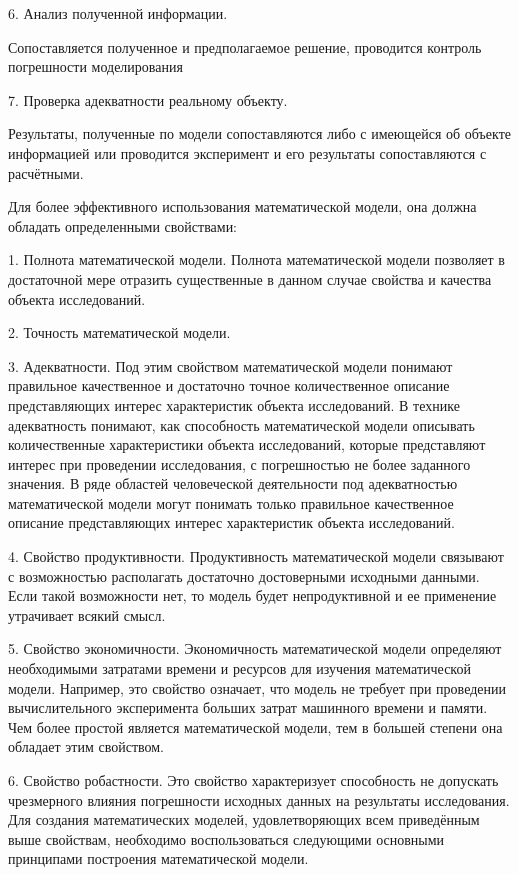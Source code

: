 6. Анализ полученной информации. 


Сопоставляется полученное и предполагаемое решение, проводится контроль погрешности моделирования


7. Проверка адекватности реальному объекту.


Результаты, полученные по модели сопоставляются либо с имеющейся об объекте информацией или проводится эксперимент и его результаты сопоставляются с расчётными.




Для более эффективного использования математической модели, она должна обладать определенными свойствами:


1. Полнота математической модели. Полнота математической модели позволяет в достаточной мере отразить существенные в данном случае свойства и качества объекта исследований. 


2. Точность математической модели.  


3. Адекватности. Под этим свойством математической модели понимают правильное качественное и достаточно точное количественное описание представляющих интерес характеристик объекта исследований. В технике адекватность понимают, как способность математической модели описывать количественные характеристики объекта исследований, которые представляют интерес при проведении исследования, с погрешностью не более заданного значения.
В ряде областей человеческой деятельности под адекватностью математической модели могут понимать только правильное качественное описание представляющих интерес характеристик объекта исследований.


4. Свойство продуктивности. Продуктивность математической модели связывают с возможностью располагать достаточно достоверными исходными данными. Если такой возможности нет, то модель будет непродуктивной и ее применение утрачивает всякий смысл.


5. Свойство экономичности. Экономичность математической модели определяют необходимыми затратами времени и ресурсов для изучения математической модели. Например, это свойство означает, что модель не требует при проведении вычислительного эксперимента больших затрат машинного времени и памяти. Чем более простой является математической модели, тем в большей степени она обладает этим свойством.


6. Свойство робастности. Это свойство характеризует способность не допускать чрезмерного влияния погрешности исходных данных на результаты исследования.
Для создания математических моделей, удовлетворяющих всем приведённым выше свойствам, необходимо воспользоваться следующими основными принципами построения математической модели.


